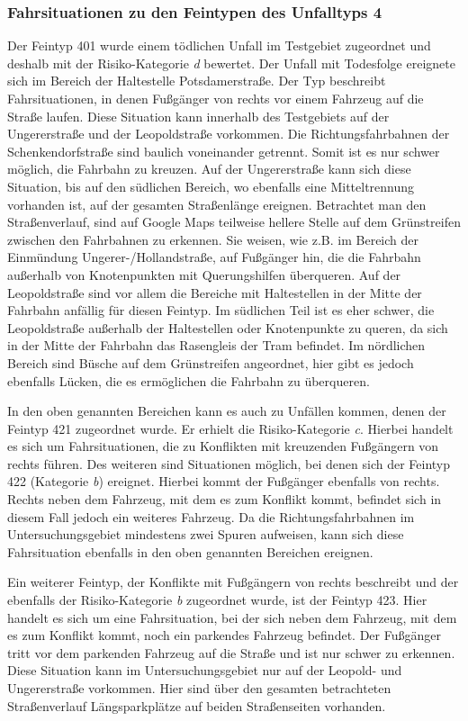 \subsubsection{Fahrsituationen zu den Feintypen des Unfalltyps 4}
Der Feintyp 401 wurde einem tödlichen Unfall im Testgebiet zugeordnet und deshalb mit der Risiko-Kategorie \textit{d} bewertet. Der Unfall mit Todesfolge ereignete sich im Bereich der Haltestelle Potsdamerstraße. Der Typ beschreibt Fahrsituationen, in denen Fußgänger von rechts vor einem Fahrzeug auf die Straße laufen. Diese Situation kann innerhalb des Testgebiets auf der Ungererstraße und der Leopoldstraße vorkommen. Die Richtungsfahrbahnen der Schenkendorfstraße sind baulich voneinander getrennt. Somit ist es nur schwer möglich, die Fahrbahn zu kreuzen. Auf der Ungererstraße kann sich diese Situation, bis auf den südlichen Bereich, wo ebenfalls eine Mitteltrennung vorhanden ist, auf der gesamten Straßenlänge ereignen. Betrachtet man den Straßenverlauf, sind auf Google Maps teilweise hellere Stelle auf dem Grünstreifen zwischen den Fahrbahnen zu erkennen. Sie weisen, wie z.B. im Bereich der Einmündung Ungerer-/Hollandstraße, auf Fußgänger hin, die die Fahrbahn außerhalb von Knotenpunkten mit Querungshilfen überqueren. Auf der Leopoldstraße sind vor allem die Bereiche mit Haltestellen in der Mitte der Fahrbahn anfällig für diesen Feintyp. Im südlichen Teil ist es eher schwer, die Leopoldstraße außerhalb der Haltestellen oder Knotenpunkte zu queren, da sich in der Mitte der Fahrbahn das Rasengleis der Tram befindet. Im nördlichen Bereich sind Büsche auf dem Grünstreifen angeordnet, hier gibt es jedoch ebenfalls Lücken, die es ermöglichen die Fahrbahn zu überqueren.

In den oben genannten Bereichen kann es auch zu Unfällen kommen, denen der Feintyp 421 zugeordnet wurde. Er erhielt die Risiko-Kategorie \textit{c}. Hierbei handelt es sich um Fahrsituationen, die zu Konflikten mit kreuzenden Fußgängern von rechts führen. Des weiteren sind Situationen möglich, bei denen sich der Feintyp 422 (Kategorie \textit{b}) ereignet. Hierbei kommt der Fußgänger ebenfalls von rechts. Rechts neben dem Fahrzeug, mit dem es zum Konflikt kommt, befindet sich in diesem Fall jedoch ein weiteres Fahrzeug. Da die Richtungsfahrbahnen im Untersuchungsgebiet mindestens zwei Spuren aufweisen, kann sich diese Fahrsituation ebenfalls in den oben genannten Bereichen ereignen.

Ein weiterer Feintyp, der Konflikte mit Fußgängern von rechts beschreibt und der ebenfalls der Risiko-Kategorie \textit{b} zugeordnet wurde, ist der Feintyp 423. Hier handelt es sich um eine Fahrsituation, bei der sich neben dem Fahrzeug, mit dem es zum Konflikt kommt, noch ein parkendes Fahrzeug befindet. Der Fußgänger tritt vor dem parkenden Fahrzeug auf die Straße und ist nur schwer zu erkennen. Diese Situation kann im Untersuchungsgebiet nur auf der Leopold- und Ungererstraße vorkommen. Hier sind über den gesamten betrachteten Straßenverlauf Längsparkplätze auf beiden Straßenseiten vorhanden.

